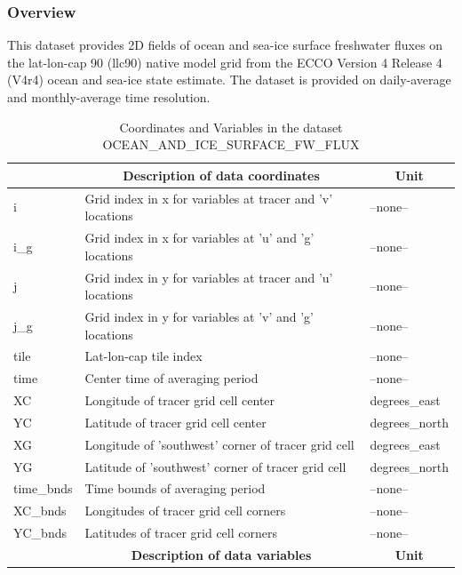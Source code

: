 \subsubsection{Overview}
This dataset provides 2D fields of ocean and sea-ice surface freshwater fluxes on the lat-lon-cap 90 (llc90) native model grid from the ECCO Version 4 Release 4 (V4r4) ocean and sea-ice state estimate. The dataset is provided on daily-average and monthly-average time resolution. 
\begin{longtable}{|m{}|m{}|m{}|}
\caption{Coordinates and Variables in the dataset OCEAN\_AND\_ICE\_SURFACE\_FW\_FLUX}
\label{tab:table-OCEAN_AND_ICE_SURFACE_FW_FLUX-fields} \\ 
\hline \endhead \hline \endfoot
\rowcolor{lightgray} \multicolumn{1}{|c|}{\textbf{Coordinates}} & \multicolumn{1}{|c|}{\textbf{Description of data coordinates}} &  \multicolumn{1}{|c|}{\textbf{Unit}}\\ \hline
i &Grid index in x for variables at tracer and 'v' locations &--none--  \\ \hline
i\_g &Grid index in x for variables at 'u' and 'g' locations &--none--  \\ \hline
j &Grid index in y for variables at tracer and 'u' locations &--none--  \\ \hline
j\_g &Grid index in y for variables at 'v' and 'g' locations &--none--  \\ \hline
tile &Lat-lon-cap tile index &--none--  \\ \hline
time &Center time of averaging period &--none--  \\ \hline
XC &Longitude of tracer grid cell center &degrees\_east  \\ \hline
YC &Latitude of tracer grid cell center &degrees\_north  \\ \hline
XG &Longitude of 'southwest' corner of tracer grid cell &degrees\_east  \\ \hline
YG &Latitude of 'southwest' corner of tracer grid cell &degrees\_north  \\ \hline
time\_bnds &Time bounds of averaging period &--none--  \\ \hline
XC\_bnds &Longitudes of tracer grid cell corners &--none--  \\ \hline
YC\_bnds &Latitudes of tracer grid cell corners &--none--  \\ \hline
\rowcolor{lightgray} \multicolumn{1}{|c|}{\textbf{Variables}} & \multicolumn{1}{|c|}{\textbf{Description of data variables}} &  \multicolumn{1}{|c|}{\textbf{Unit}}\\ \hline

\end{longtable}

